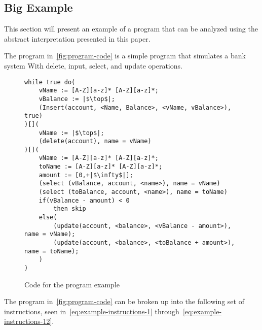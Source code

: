 \subsection{Big Example}\label{subsec:big-example}
This section will present an example of a program that can be analyzed using the abstract interpretation presented in this paper.

The program in~\autoref{fig:program-code} is a simple program that simulates a bank system With delete, input, select, and update operations.
\begin{figure}
    \begin{verbatim}
while true do(
    vName := [A-Z][a-z]* [A-Z][a-z]*;
    vBalance := |$\top$|;
    (Insert(account, <Name, Balance>, <vName, vBalance>), true)
)[](
    vName := |$\top$|;
    (delete(account), name = vName)
)[](
    vName := [A-Z][a-z]* [A-Z][a-z]*;
    toName := [A-Z][a-z]* [A-Z][a-z]*;
    amount := [0,+|$\infty$|];
    (select (vBalance, account, <name>), name = vName)
    (select (toBalance, account, <name>), name = toName)
    if(vBalance - amount) < 0
        then skip
    else(
        (update(account, <balance>, <vBalance - amount>), name = vName);
        (update(account, <balance>, <toBalance + amount>), name = toName);
    )
)
    \end{verbatim}
    \caption{Code for the program example}
    \label{fig:program-code}
\end{figure}

The program in~\autoref{fig:program-code} can be broken up into the following set of instructions, seen in~\autoref{eq:example-instructions-1} through~\autoref{eq:example-instructions-12}.

